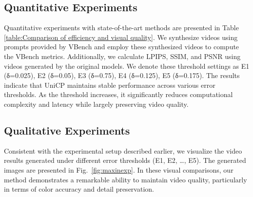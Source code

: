 \subsection{Quantitative Experiments}
Quantitative experiments with state-of-the-art methods are presented in Table \ref{table:Comparison of efficiency and visual quality}. We synthesize videos using prompts provided by VBench and employ these synthesized videos to compute the VBench metrics. Additionally, we calculate LPIPS, SSIM, and PSNR using videos generated by the original models. We denote these threshold settings as E1 (δ=0.025), E2 (δ=0.05), E3 (δ=0.75), E4 (δ=0.125), E5 (δ=0.175). The results indicate that UniCP maintains stable performance across various error thresholds. As the threshold increases, it significantly reduces computational complexity and latency while largely preserving video quality.





\subsection{Qualitative Experiments} Consistent with the experimental setup described earlier, we visualize the video results generated under different error thresholds (E1, E2, \ldots, E5). The generated images are presented in Fig.~\ref{fig:maxinexp}. In these visual comparisons, our method demonstrates a remarkable ability to maintain video quality, particularly in terms of color accuracy and detail preservation.




        
